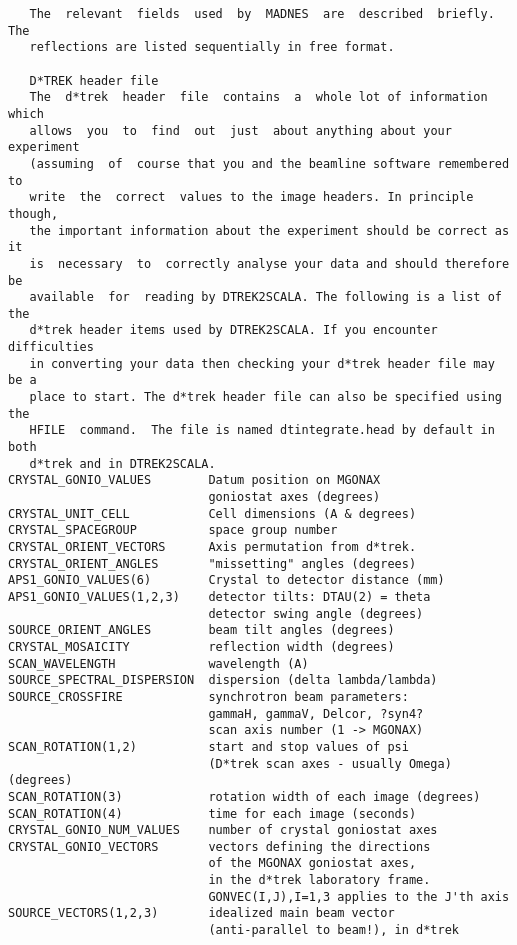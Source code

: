 \documentclass[a4paper, 11pt]{article}
\begin{document}
{\begin{verbatim}
   The  relevant  fields  used  by  MADNES  are  described  briefly.  The
   reflections are listed sequentially in free format.

   D*TREK header file
   The  d*trek  header  file  contains  a  whole lot of information which
   allows  you  to  find  out  just  about anything about your experiment
   (assuming  of  course that you and the beamline software remembered to
   write  the  correct  values to the image headers. In principle though,
   the important information about the experiment should be correct as it
   is  necessary  to  correctly analyse your data and should therefore be
   available  for  reading by DTREK2SCALA. The following is a list of the
   d*trek header items used by DTREK2SCALA. If you encounter difficulties
   in converting your data then checking your d*trek header file may be a
   place to start. The d*trek header file can also be specified using the
   HFILE  command.  The file is named dtintegrate.head by default in both
   d*trek and in DTREK2SCALA.
CRYSTAL_GONIO_VALUES        Datum position on MGONAX
                            goniostat axes (degrees)
CRYSTAL_UNIT_CELL           Cell dimensions (A & degrees)
CRYSTAL_SPACEGROUP          space group number
CRYSTAL_ORIENT_VECTORS      Axis permutation from d*trek.
CRYSTAL_ORIENT_ANGLES       "missetting" angles (degrees)
APS1_GONIO_VALUES(6)        Crystal to detector distance (mm)
APS1_GONIO_VALUES(1,2,3)    detector tilts: DTAU(2) = theta
                            detector swing angle (degrees)
SOURCE_ORIENT_ANGLES        beam tilt angles (degrees)
CRYSTAL_MOSAICITY           reflection width (degrees)
SCAN_WAVELENGTH             wavelength (A)
SOURCE_SPECTRAL_DISPERSION  dispersion (delta lambda/lambda)
SOURCE_CROSSFIRE            synchrotron beam parameters:
                            gammaH, gammaV, Delcor, ?syn4?
                            scan axis number (1 -> MGONAX)
SCAN_ROTATION(1,2)          start and stop values of psi
                            (D*trek scan axes - usually Omega)  (degrees)
SCAN_ROTATION(3)            rotation width of each image (degrees)
SCAN_ROTATION(4)            time for each image (seconds)
CRYSTAL_GONIO_NUM_VALUES    number of crystal goniostat axes
CRYSTAL_GONIO_VECTORS       vectors defining the directions
                            of the MGONAX goniostat axes,
                            in the d*trek laboratory frame.
                            GONVEC(I,J),I=1,3 applies to the J'th axis
SOURCE_VECTORS(1,2,3)       idealized main beam vector
                            (anti-parallel to beam!), in d*trek

\end{verbatim}}
\end{document}
